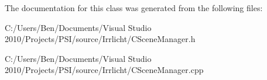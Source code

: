 The documentation for this class was generated from the following files\-:\begin{DoxyCompactItemize}
\item 
C\-:/\-Users/\-Ben/\-Documents/\-Visual Studio 2010/\-Projects/\-P\-S\-I/source/\-Irrlicht/C\-Scene\-Manager.\-h\item 
C\-:/\-Users/\-Ben/\-Documents/\-Visual Studio 2010/\-Projects/\-P\-S\-I/source/\-Irrlicht/C\-Scene\-Manager.\-cpp\end{DoxyCompactItemize}
